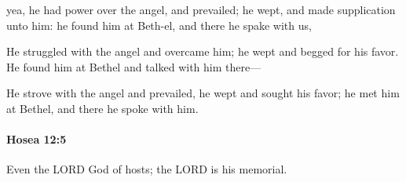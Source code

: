 			\begin{versebox}
					\item[BHS] 
					\item[LXX] 
					\item[ASV] yea, he had power over the angel, and prevailed; he wept, and made supplication unto him: he found him at Beth-el, and there he spake with us,
					\item[NIV] He struggled with the angel and overcame him; he wept and begged for his favor. He found him at Bethel and talked with him there—
					\item[NRSV] He strove with the angel and prevailed, he wept and sought his favor; he met him at Bethel, and there he spoke with him.
			\end{versebox}

		\paragraph{Hosea 12:5} %
			\label{HOSEA-12-5}

			Even the LORD God of hosts; the LORD is his memorial.

